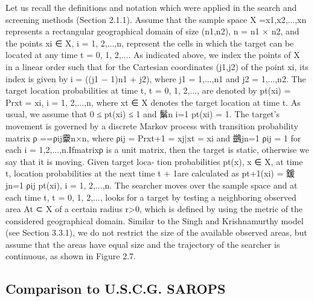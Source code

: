 \documentclass[12pt, letterpaper]{article}  %
\theoremstyle{definition}
\theoremstyle{remark}
\newtheorem{lem}[thm]{Lemma}
\theoremstyle{plain}
\begin{document}
Let us recall the deﬁnitions and notation which were applied in the search and screening
methods (Section 2.1.1). Assume that the sample space X ={x1,x2,...,xn} represents a
rectangular geographical domain of size (n1,n2), n = n1 × n2, and the points xi ∈ X, i =
1, 2,...,n, represent the cells in which the target can be located at any time t = 0, 1, 2,....
As indicated above, we index the points of X in a linear order such that for the Cartesian
coordinates (j1,j2) of the point xi, its index is given by i = ((j1 − 1)n1 + j2), where
j1 = 1,...,n1 and j2 = 1,...,n2.
The target location probabilities at time t, t = 0, 1, 2,..., are denoted by pt(xi) =
Pr{xt = xi}, i = 1, 2,...,n, where xt ∈ X denotes the target location at time t. As usual,
we assume that 0 ≤ pt(xi) ≤ 1 and
鬀n
i=1 pt(xi) = 1. The target’s movement is governed
by a discrete Markov process with transition probability matrix ρ ==ρij靀n×n, where ρij =
Pr{xt+1 = xj|xt = xi} and 鷀jn=1 ρij = 1 for each i = 1,2,...,n.Ifmatrixρ is a unit
matrix, then the target is static, otherwise we say that it is moving. Given target loca-
tion probabilities pt(x), x ∈ X, at time t, location probabilities at the next time t + 1are
calculated as pt+1(xi) = 鍰jn=1 ρij pt(xi), i = 1, 2,...,n.
The searcher moves over the sample space and at each time t, t = 0, 1, 2,..., looks
for a target by testing a neighboring observed area At ⊂ X of a certain radius r>0, which
is deﬁned by using the metric of the considered geographical domain. Similar to the Singh
and Krishnamurthy model (see Section 3.3.1), we do not restrict the size of the available
observed areas, but assume that the areas have equal size and the trajectory of the searcher
is continuous, as shown in Figure 2.7.



\subsection{Comparison to U.S.C.G. SAROPS}\label{subsec:sarops}




\end{document}
